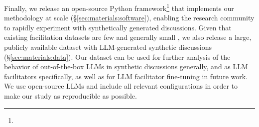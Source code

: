 Finally, we release an open-source Python framework\footnote{\librarylink} that implements our methodology at scale (\S\ref{sec:materials:software}), enabling the research community to rapidly experiment with synthetically generated discussions. Given that existing facilitation datasets are few and generally small \cite{korre2025evaluation}, we also release a large, publicly available dataset with LLM-generated synthetic discussions (\S\ref{sec:materials:data}). Our dataset can be used for further analysis of the behavior of out-of-the-box LLMs in synthetic discussions generally, and as LLM facilitators specifically, as well as for LLM facilitator fine-tuning \cite{ulmer2024} in future work. We use open-source LLMs and include all relevant configurations in order to make our study as reproducible as possible.